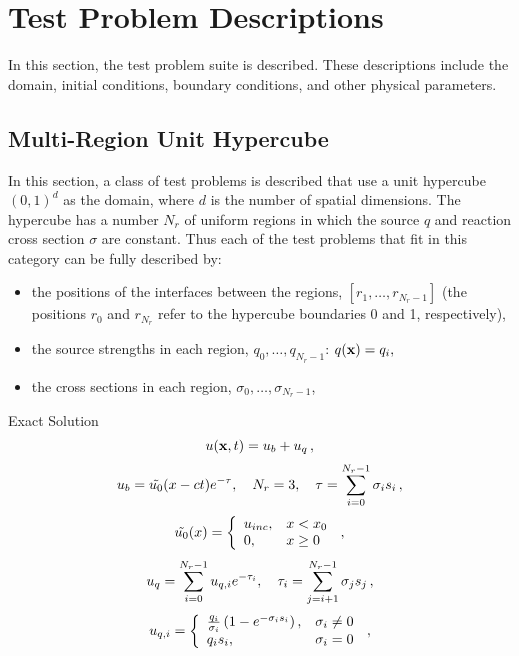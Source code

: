 \section{Test Problem Descriptions}
In this section, the test problem suite is described. These descriptions
include the domain, initial conditions, boundary conditions, and other
physical parameters.
\subsection{Multi-Region Unit Hypercube}\label{sec:multi_region}
In this section, a class of test problems is described that use a unit
hypercube $(0,1)^d$ as the domain, where $d$ is the number of
spatial dimensions. The hypercube has a number $N_r$ of uniform regions
in which the source $q$ and reaction cross section $\sigma$ are
constant. Thus each of the test problems that fit in this
category can be fully described by:
\begin{itemize}
  \item the positions of the interfaces between the regions,
    $[r_1,\ldots,r_{N_r-1}]$ (the positions $r_0$ and $r_{N_r}$
    refer to the hypercube boundaries 0 and 1, respectively),
  \item the source strengths in each region, $q_0,\ldots,q_{N_r-1}$:
    $q(\mathbf{x}) = q_i,\qquad $
  \item the cross sections in each region, $\sigma_0,\ldots,\sigma_{N_r-1}$,
\end{itemize}

Exact Solution
\[
  u(\mathbf{x},t) = u_b + u_q \,,
\]
\[
  u_b=\tilde{u_0}(x-ct)e^{-\tau},
        \quad N_r=3,\quad
        \tau = \sum\limits_{i=0}^{N_r-1} \sigma_i s_i \,,
\]
\[
  \tilde{u_0}(x) = \left\{\begin{array}{l l}
        u_{inc}, & x<x_0\\
        0,       & x\geq 0
     \end{array}\right. \,,
\]
\[
  u_q=\sum\limits_{i=0}^{N_r-1}u_{q,i}e^{-\tau_i},\quad
        \tau_i = \sum\limits_{j=i+1}^{N_r-1} \sigma_j s_j \,,
\]
\[
  u_{q,i} = \left\{\begin{array}{l l}
        \frac{q_i}{\sigma_i}\left(1-e^{-\sigma_i s_i}\right), & \sigma_i\neq 0\\
        q_i s_i, & \sigma_i = 0
        \end{array}\right. \,,
\]
